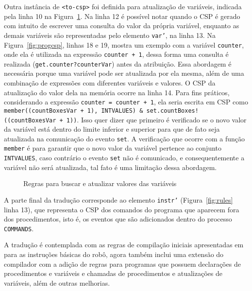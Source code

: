 Outra instância de \texttt{<to-csp>} foi definida para atualização de variáveis, indicada pela linha 10 na Figura~\ref{fig:rules_var}. Na linha 12 é possível notar quando o CSP é gerado com intuito de escrever uma consulta do valor da própria variável, enquanto as demais variáveis são representadas pelo elemento \texttt{var'}, na linha 13. Na Figura~\ref{fig:progcsp}, linhas 18 e 19, mostra um exemplo com a variável \texttt{counter}, onde ela é utilizada na expressão \texttt{counter + 1}, dessa forma uma consulta é realizada (\texttt{get.counter?counterVar}) antes da atribuição. Essa abordagem é necessária porque uma variável pode ser atualizada por ela mesma, além de uma combinação de expressões com diferentes variáveis e valores. O CSP da atualização do valor dela na memória ocorre na linha 14. Para fins práticos, considerando a expressão \texttt{counter = counter + 1}, ela seria escrita em CSP como \texttt{member((countBoxesVar + 1), INTVALUES) \& set.countBoxes!((countBoxesVar + 1))}. Isso quer dizer que primeiro é verificado se o novo valor da variável está dentro do limite inferior e superior para que de fato seja atualizada na comunicação do evento \texttt{set}. A verificação que ocorre com a função \texttt{member} é para garantir que o novo valor da variável pertence ao conjunto \texttt{INTVALUES}, caso contrário o evento \texttt{set} não é comunicado,  e consequentemente a variável não será atualizada, tal fato é uma limitação dessa abordagem.

\begin{figure}[!h]
\centering
\caption{Regras para buscar e atualizar valores das variáveis}

\label{fig:rules_var}
\end{figure}


A parte final da tradução corresponde ao elemento \texttt{instr'} (Figura~\ref{fig:rules} linha 13), que representa o CSP dos comandos do programa que aparecem fora dos procedimentos, isto é, os eventos que são adicionados dentro do processo \texttt{COMMANDS}.

A tradução é contemplada com as regras de compilação iniciais apresentadas em \cite{nogueira} para as instruções básicas do robô, agora também inclui uma extensão do compilador com a adição de regras para programas que possuem declarações de procedimentos e variáveis e chamadas de procedimentos e atualizações de variáveis, além de outras melhorias.

